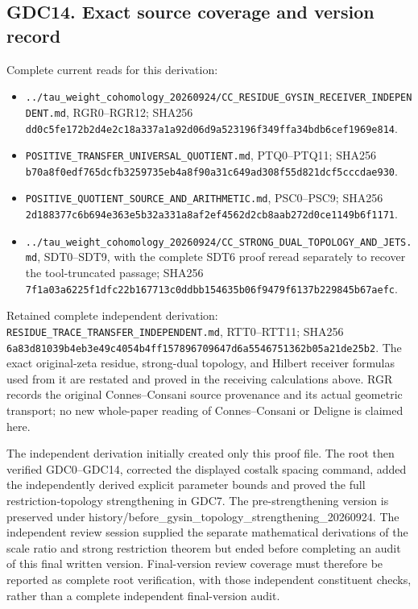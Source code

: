 \subsection{GDC14. Exact source coverage and version
record}\label{gdc14.-exact-source-coverage-and-version-record}

Complete current reads for this derivation:

\begin{itemize}
\tightlist
\item
  \nolinkurl{../tau_weight_cohomology_20260924/CC_RESIDUE_GYSIN_RECEIVER_INDEPENDENT.md},
  RGR0--RGR12; SHA256
  \nolinkurl{dd0c5fe172b2d4e2c18a337a1a92d06d9a523196f349ffa34bdb6cef1969e814}.
\item
  \nolinkurl{POSITIVE_TRANSFER_UNIVERSAL_QUOTIENT.md}, PTQ0--PTQ11;
  SHA256
  \nolinkurl{b70a8f0edf765dcfb3259735eb4a8f90a31c649ad308f55d821dcf5cccdae930}.
\item
  \nolinkurl{POSITIVE_QUOTIENT_SOURCE_AND_ARITHMETIC.md}, PSC0--PSC9;
  SHA256
  \nolinkurl{2d188377c6b694e363e5b32a331a8af2ef4562d2cb8aab272d0ce1149b6f1171}.
\item
  \nolinkurl{../tau_weight_cohomology_20260924/CC_STRONG_DUAL_TOPOLOGY_AND_JETS.md},
  SDT0--SDT9, with the complete SDT6 proof reread separately to recover
  the tool-truncated passage; SHA256
  \nolinkurl{7f1a03a6225f1dfc22b167713c0ddbb154635b06f9479f6137b229845b67aefc}.
\end{itemize}

Retained complete independent derivation:
\nolinkurl{RESIDUE_TRACE_TRANSFER_INDEPENDENT.md}, RTT0--RTT11; SHA256
\nolinkurl{6a83d81039b4eb3e49c4054b4ff157896709647d6a5546751362b05a21de25b2}.
The exact original-zeta residue, strong-dual topology, and Hilbert
receiver formulas used from it are restated and proved in the receiving
calculations above. RGR records the original Connes--Consani source
provenance and its actual geometric transport; no new whole-paper
reading of Connes--Consani or Deligne is claimed here.

The independent derivation initially created only this proof file. The
root then verified GDC0--GDC14, corrected the displayed costalk spacing
command, added the independently derived explicit parameter bounds and
proved the full restriction-topology strengthening in GDC7. The
pre-strengthening version is preserved under
history/before\_gysin\_topology\_strengthening\_20260924. The
independent review session supplied the separate mathematical
derivations of the scale ratio and strong restriction theorem but ended
before completing an audit of this final written version. Final-version
review coverage must therefore be reported as complete root
verification, with those independent constituent checks, rather than a
complete independent final-version audit.
